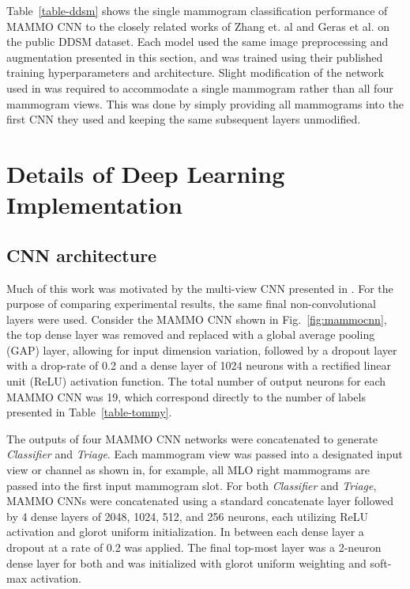 \documentclass[journal]{IEEEtran}
\begin{document}
Table~\ref{table-ddsm} shows the single mammogram classification performance of MAMMO CNN to the closely related works of Zhang et. al \cite{fullimage-zhang} and Geras et al. \cite{krysztof-etal-2017} on the public DDSM dataset.  Each model used the same image preprocessing and augmentation presented in this section, and was trained using their published training hyperparameters and architecture.  Slight modification of the network used in \cite{krysztof-etal-2017} was required to accommodate a single mammogram rather than all four mammogram views.  This was done by simply providing all mammograms into the first CNN they used and keeping the same subsequent layers unmodified.  


\section{\label{Appendix:Architecture} Details of Deep Learning Implementation}
\subsection{CNN architecture}
Much of this work was motivated by the multi-view CNN presented in \cite{krysztof-etal-2017}. For the purpose of comparing experimental results, the same final non-convolutional layers were used.  Consider the MAMMO CNN shown in Fig.~\ref{fig:mammocnn}, the top dense layer was removed and replaced with a global average pooling (GAP) layer, allowing for input dimension variation, followed by a dropout layer with a drop-rate of 0.2 and a dense layer of 1024 neurons with a rectified linear unit (ReLU) activation function. The total number of output neurons for each MAMMO CNN was 19, which correspond directly to the number of labels presented in Table~\ref{table-tommy}.

The outputs of four MAMMO CNN networks were concatenated to generate  \textit{Classifier} and \textit{Triage}.  Each mammogram view was passed into a designated input view or channel as shown in, for example, all MLO right mammograms are passed into the first input mammogram slot.  For both \textit{Classifier} and \textit{Triage}, MAMMO CNNs were concatenated using a standard concatenate layer followed by 4 dense layers of 2048, 1024, 512, and 256 neurons, each utilizing ReLU activation and glorot uniform initialization.  In between each dense layer a dropout at a rate of 0.2 was applied.  The final top-most layer was a 2-neuron dense layer for both and was initialized with glorot uniform weighting and soft-max activation. 
\end{document}
